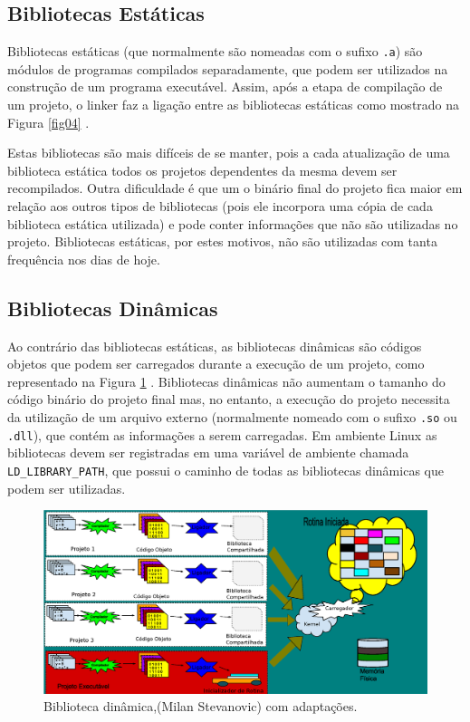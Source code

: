 \subsection{Bibliotecas Estáticas}

Bibliotecas estáticas (que normalmente  são nomeadas com o  sufixo \texttt{.a}) 
são módulos de programas compilados separadamente, que podem ser utilizados
 na construção de um programa executável. Assim, após a etapa de compilação de
 um projeto, o linker faz a ligação entre as bibliotecas estáticas como
 mostrado na Figura \ref{fig04} \cite{ref39}.

Estas bibliotecas são mais difíceis de se manter, pois a cada atualização de uma
 biblioteca estática todos os projetos dependentes da mesma devem ser recompilados.
 Outra dificuldade é que um o binário final do projeto fica maior em relação aos
 outros tipos de bibliotecas (pois ele incorpora uma cópia de cada biblioteca
 estática utilizada) e pode conter informações que não são utilizadas no projeto.
 Bibliotecas estáticas, por estes motivos, não são utilizadas com tanta
 frequência nos dias de hoje.


\subsection{Bibliotecas Dinâmicas}

Ao contrário das bibliotecas estáticas, as bibliotecas dinâmicas são códigos
 objetos que podem ser carregados durante a execução de um projeto, como
 representado na Figura \ref{fig06} \cite{ref41}. Bibliotecas dinâmicas 
não aumentam o tamanho do código binário do projeto final mas, no entanto,
 a execução do projeto necessita da utilização de um arquivo externo
 (normalmente nomeado com o sufixo \texttt{.so} ou \texttt{.dll}), que contém as
 informações a serem carregadas\cite{Lasca2}. Em ambiente Linux as
 bibliotecas devem ser  registradas em uma variável de ambiente chamada
 \texttt{LD\_LIBRARY\_PATH}, que possui o caminho de todas as bibliotecas dinâmicas
 que podem ser utilizadas.

\begin{figure}[h]
    \centering
        \includegraphics[keepaspectratio=true,scale=0.45]{figuras/dynamic_lib.eps}
    \caption{Biblioteca dinâmica,(Milan Stevanovic) com adaptações.}
    \label{fig06}
\end{figure}


